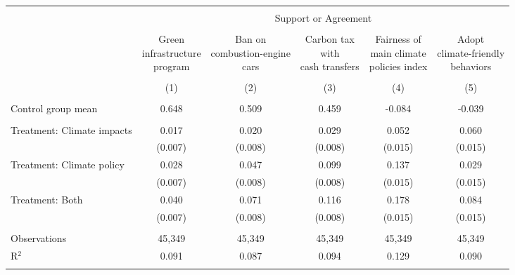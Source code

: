 
\begin{tabular}{@{\extracolsep{5pt}}lccccc} 
\\[-1.8ex]\hline 
\hline \\[-1.8ex] 
 & \multicolumn{5}{c}{Support or Agreement} \\ 
\cline{2-6} 
\\[-1.8ex] & \makecell{Green\\infrastructure\\program} & \makecell{Ban on\\combustion-engine\\cars} & \makecell{Carbon tax\\with\\cash transfers} & \makecell{Fairness of\\main climate\\policies index} & \makecell{Adopt\\climate-friendly\\behaviors} \\ 
\\[-1.8ex] & (1) & (2) & (3) & (4) & (5)\\ 
\hline \\[-1.8ex] 
Control group mean & 0.648 & 0.509 & 0.459 & -0.084 & -0.039  \\ \hline \\[-1.8ex]
 Treatment: Climate impacts & 0.017 & 0.020 & 0.029 & 0.052 & 0.060 \\ 
  & (0.007) & (0.008) & (0.008) & (0.015) & (0.015) \\ 
  Treatment: Climate policy & 0.028 & 0.047 & 0.099 & 0.137 & 0.029 \\ 
  & (0.007) & (0.008) & (0.008) & (0.015) & (0.015) \\ 
  Treatment: Both & 0.040 & 0.071 & 0.116 & 0.178 & 0.084 \\ 
  & (0.007) & (0.008) & (0.008) & (0.015) & (0.015) \\ 
 \hline \\[-1.8ex] 

Observations & 45,349 & 45,349 & 45,349 & 45,349 & 45,349 \\ 
R$^{2}$ & 0.091 & 0.087 & 0.094 & 0.129 & 0.090 \\ 
\hline 
\hline \\[-1.8ex] 
\end{tabular} 